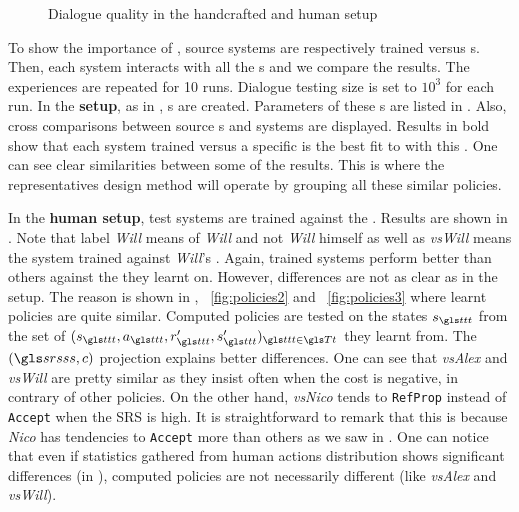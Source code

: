\begin{figure}
\begin{center}
        \caption{Dialogue quality in the handcrafted and human setup}
        \label{fig:handcrafted}
    \end{center}
\end{figure}
To show the importance of , source systems are respectively trained versus s. Then, each system interacts with all the s and we compare the results. The experiences are repeated for 10 runs. Dialogue testing size is set to $10^3$ for each run. In the \textbf{ setup}, as in \textcite{Genevay2016}, s are created. Parameters of these s are listed in . Also, cross comparisons between source s and systems are displayed. Results in bold show that each system trained versus a specific  is the best fit to  with this . One can see clear similarities between some of the results. This is where the representatives design method will operate by grouping all these similar policies.

In the \textbf{human setup}, test systems are trained against the . Results are shown in . Note that label \textit{Will} means  of \textit{Will} and not \textit{Will} himself as well as \textit{vsWill} means the system trained against \textit{Will}'s . Again, trained systems perform better than others against the  they learnt on. However, differences are not as clear as in the  setup. The reason is shown in , ~\ref{fig:policies2} and ~\ref{fig:policies3} where learnt policies are quite similar. Computed policies are tested on the states $s_{\indextransition}$  from the set of $(s_{\indextransition},a_{\indextransition},r'_{\indextransition},s'_{\indextransition})_{\indextransition \in \T}$ they learnt from. The $(\srs,c)$ projection explains better  differences. One can see that \textit{vsAlex} and \textit{vsWill} are pretty similar as they insist often when the cost is negative, in contrary of other policies. On the other hand, \textit{vsNico} tends to \texttt{RefProp} instead of \texttt{Accept} when the \gls{SRS} is high. It is straightforward to remark that this is because \textit{Nico} has tendencies to \texttt{Accept} more than others as we saw in .
One can notice that even if statistics gathered from human actions distribution shows significant differences (in ), computed policies are not necessarily different (like \textit{vsAlex} and \textit{vsWill}).

